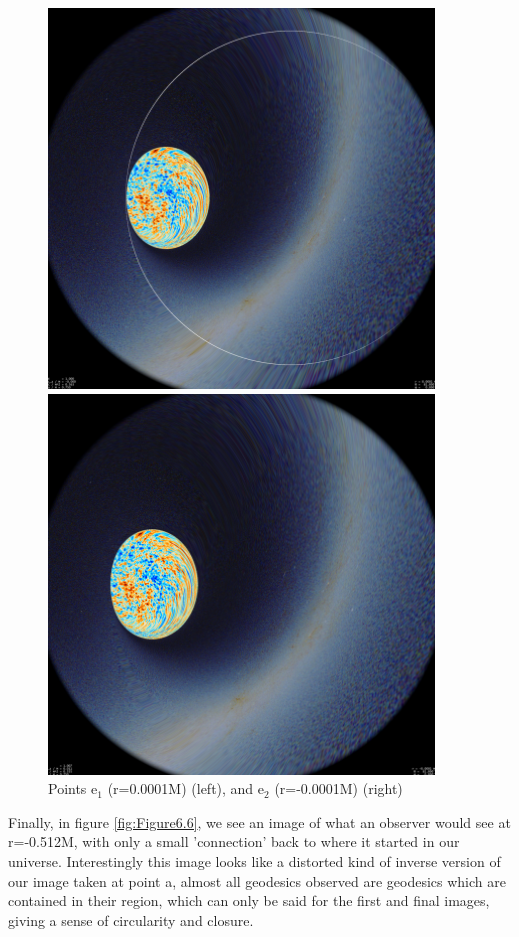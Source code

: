 \documentclass[oneside,openright,frontopenright, singlespacing]{dmathesis}
\begin{document}
\vspace{1em}
\begin{figure}[!ht]
	\centering
	\begin{minipage}{0.5\textwidth}
		\centering
		\includegraphics[width=0.7\linewidth]{img/plunging5-1}
	\end{minipage}%
	\hfill
	\begin{minipage}{0.5\textwidth}
		\centering
		\includegraphics[width=0.7\linewidth]{img/plunging5-2}
	\end{minipage}
	\caption{Points e$_1$ (r=0.0001M) (left), and e$_2$ (r=-0.0001M) (right)}
	\label{fig:Figure6.5}
\end{figure}

\vspace{1em}
	Finally, in figure \ref{fig:Figure6.6}, we see an image of what an observer would see at r=-0.512M, with only a small 'connection' back to where it started in our universe. Interestingly this image looks like a distorted kind of inverse version of our image taken at point a, almost all geodesics observed are geodesics which are contained in their region, which can only be said for the first and final images, giving a sense of circularity and closure.
\end{document}
